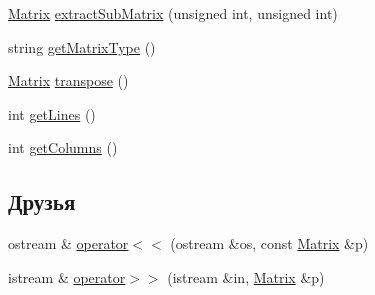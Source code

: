 \begin{DoxyCompactItemize}
\item 
\hyperlink{class_matrix}{Matrix} \hyperlink{class_matrix_adc694bfade2852594a5ce3efcf17a616}{extract\-Sub\-Matrix} (unsigned int, unsigned int)
\item 
string \hyperlink{class_matrix_a171ca8f5a482ede4adc3a84d10f59da3}{get\-Matrix\-Type} ()
\item 
\hyperlink{class_matrix}{Matrix} \hyperlink{class_matrix_ae23f817021383e3c8636a714dcba1d21}{transpose} ()
\item 
int \hyperlink{class_matrix_acc315708bcdb54795a686b91277f5bdf}{get\-Lines} ()
\item 
int \hyperlink{class_matrix_a324b4057cd6e2167687e406abd720020}{get\-Columns} ()
\end{DoxyCompactItemize}
\subsection*{Друзья}
\begin{DoxyCompactItemize}
\item 
ostream \& \hyperlink{class_matrix_aa8f4214bd22af7e40971a2614816063d}{operator$<$$<$} (ostream \&os, const \hyperlink{class_matrix}{Matrix} \&p)
\item 
istream \& \hyperlink{class_matrix_a4e914824d92c87ee5eb20abe65f35ff3}{operator$>$$>$} (istream \&in, \hyperlink{class_matrix}{Matrix} \&p)
\end{DoxyCompactItemize}


